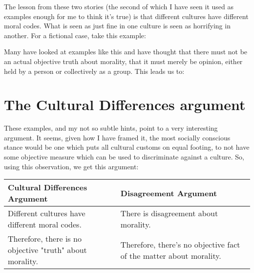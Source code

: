 The lesson from these two stories (the second of which I have seen it used as examples enough for me to think it's true) is that different cultures have different moral codes. What is seen as just fine in one culture is seen as horrifying in another. For a fictional case, take this example:


Many have looked at examples like this and have thought that there must not be an actual objective truth about morality, that it must merely be opinion, either held by a person or collectively as a group. This leads us to:

\section{The Cultural Differences argument}

These examples, and my not so subtle  hints, point to a very interesting argument. It seems, given how I have framed it, the most socially conscious stance would be one which puts all cultural customs on equal footing, to not have some objective measure which can be used to discriminate against a culture. So, using this observation, we get this argument:
\noindent
\begin{tabular}{p{2.75in}|p{2.75in}}
Cultural Differences Argument&Disagreement Argument\\\hline
    Different cultures have different moral codes.&There is disagreement about morality.\\
    Therefore, there is no objective "truth" about morality.&Therefore, there's no objective fact of the matter about morality.
\end{tabular}

